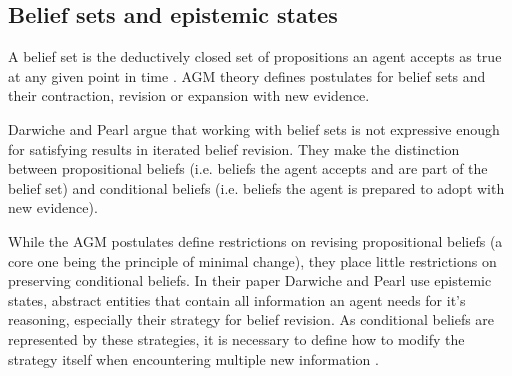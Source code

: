 \documentclass[english, 12pt]{scrartcl}
\theoremstyle{definition}
\theoremstyle{definition}
\theoremstyle{definition}
\begin{document}
\subsection{Belief sets and epistemic states}
A belief set is the deductively closed set of propositions an agent accepts as true at any given point in time \cite{Ferme2011}. AGM theory \cite{Alchourron1985} defines postulates for belief sets and their contraction, revision or expansion with new evidence.


Darwiche and Pearl \cite{Darwiche1997} argue that working with belief sets is not expressive enough for satisfying results in iterated belief revision. They make the distinction between propositional beliefs (i.e. beliefs the agent accepts and are part of the belief set) and conditional beliefs (i.e. beliefs the agent is prepared to adopt with new evidence).

While the AGM postulates define restrictions on revising propositional beliefs (a core one being the principle of minimal change), they place little restrictions on preserving conditional beliefs. In their paper Darwiche and Pearl use epistemic states, abstract entities that contain all information an agent needs for it's reasoning, especially their strategy for belief revision. As conditional beliefs are represented by these strategies, it is necessary to define how to modify the strategy itself when encountering multiple new information \cite{Darwiche1997}.
\end{document}
